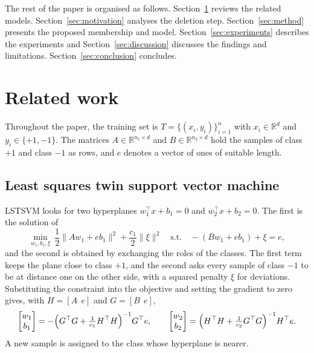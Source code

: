 \documentclass[preprint,12pt]{elsarticle}
\newcommand{\R}{\mathbb{R}}
\begin{document}
The rest of the paper is organised as follows. Section~\ref{sec:related} reviews the related models. Section~\ref{sec:motivation} analyses the deletion step. Section~\ref{sec:method} presents the proposed membership and model. Section~\ref{sec:experiments} describes the experiments and Section~\ref{sec:discussion} discusses the findings and limitations. Section~\ref{sec:conclusion} concludes.

\section{Related work}
\label{sec:related}

Throughout the paper, the training set is $T=\{(x_i,y_i)\}_{i=1}^{n}$ with $x_i\in\R^{d}$ and $y_i\in\{+1,-1\}$. The matrices $A\in\R^{n_1\times d}$ and $B\in\R^{n_2\times d}$ hold the samples of class $+1$ and class $-1$ as rows, and $e$ denotes a vector of ones of suitable length.

\subsection{Least squares twin support vector machine}

LSTSVM \cite{kumar2009} looks for two hyperplanes $w_1^{\top}x+b_1=0$ and $w_2^{\top}x+b_2=0$. The first is the solution of
\begin{equation}
\min_{w_1,b_1,\xi}\ \frac{1}{2}\lVert Aw_1+eb_1\rVert^{2}+\frac{c_1}{2}\lVert\xi\rVert^{2}
\quad\text{s.t.}\quad -(Bw_1+eb_1)+\xi=e ,
\label{eq:lstsvm}
\end{equation}
and the second is obtained by exchanging the roles of the classes. The first term keeps the plane close to class $+1$, and the second asks every sample of class $-1$ to be at distance one on the other side, with a squared penalty $\xi$ for deviations. Substituting the constraint into the objective and setting the gradient to zero gives, with $H=[A\ \ e]$ and $G=[B\ \ e]$,
\begin{equation}
\begin{bmatrix}w_1\\ b_1\end{bmatrix}=-\Bigl(G^{\top}G+\tfrac{1}{c_1}H^{\top}H\Bigr)^{-1}G^{\top}e ,\qquad
\begin{bmatrix}w_2\\ b_2\end{bmatrix}=\Bigl(H^{\top}H+\tfrac{1}{c_2}G^{\top}G\Bigr)^{-1}H^{\top}e .
\end{equation}
A new sample is assigned to the class whose hyperplane is nearer.
\end{document}
